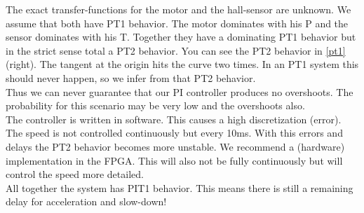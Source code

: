 The exact transfer-functions for the motor and the hall-sensor are unknown. We assume that both have PT1 behavior. The motor dominates with his P and the sensor dominates with his T.
Together they have a dominating PT1 behavior but in the strict sense total a PT2 behavior. You can see the PT2 behavior in \ref{pt1} (right). The tangent at the origin hits the curve two times. In an PT1 system this should never happen, so we infer from that PT2 behavior.\\

Thus we can never guarantee that our PI controller produces no overshoots. The probability for this scenario may be very low and the overshoots also.\\

The controller is written in software. This causes a high discretization (error). The speed
is not controlled continuously but every 10ms. With this errors and delays the PT2 behavior
becomes more unstable. We recommend a (hardware) implementation in the FPGA. This will also not be fully continuously but will control the speed more detailed.\\

All together the system has PIT1 behavior. This means there is still a remaining delay for acceleration and slow-down!